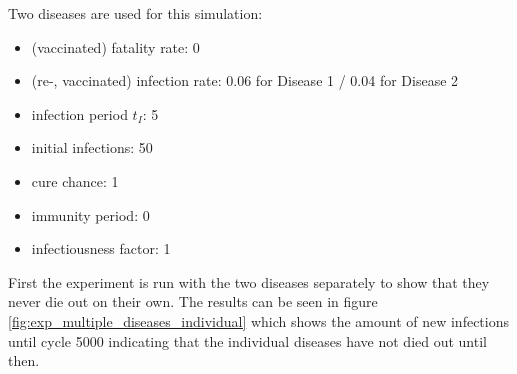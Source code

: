 Two diseases are used for this simulation:
\begin{itemize}
    \item (vaccinated) fatality rate: 0
    \item (re-, vaccinated) infection rate: 0.06 for Disease 1 / 0.04 for Disease 2
    \item infection period $t_I$: 5
    \item initial infections: 50
    \item cure chance: 1
    \item immunity period: 0
    \item infectiousness factor: 1
\end{itemize}

First the experiment is run with the two diseases separately to show that they never die out
on their own. The results can be seen in figure \ref{fig:exp_multiple_diseases_individual}
which shows the amount of new infections until cycle 5000 indicating that the individual 
diseases have not died out until then.

